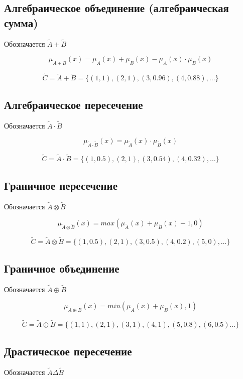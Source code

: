 		\subsection{Алгебраическое объединение (алгебраическая сумма)}
		    Обозначается $\tilde A + \tilde B$
		
	        \[\mu_{\tilde A + \tilde B}(x) = \mu_{\tilde A}(x) + \mu_{\tilde B}(x) - \mu_{\tilde A}(x) \cdot \mu_{\tilde B}(x)\]
		    
			\[\tilde C = \tilde A + \tilde B = \{(1, 1), (2, 1), (3, 0.96), (4, 0.88), \dots\}\]
			
		\subsection{Алгебраическое пересечение}
		    Обозначается $\tilde A \cdot \tilde B$
		
			\[\mu_{\tilde A \cdot \tilde B}(x) = \mu_{\tilde A}(x) \cdot \mu_{\tilde B}(x)\]
			
			\[\tilde C = \tilde A \cdot \tilde B = \{(1, 0.5), (2, 1), (3, 0.54), (4, 0.32), \dots\}\]
			
		\subsection{Граничное пересечение} 
		    Обозначается $\tilde A \otimes \tilde B$
		    
		    \[\mu_{\tilde A \otimes \tilde B}(x) = max(\mu_{\tilde A}(x) + \mu_{\tilde B}(x) - 1, 0)\]
			
			\[\tilde C = \tilde A \otimes \tilde B = \{(1, 0.5), (2, 1), (3, 0.5), (4, 0.2), (5, 0), \dots\}\]
			
		\subsection{Граничное объединение}
		    Обозначается $\tilde A \oplus \tilde B$
		
			\[\mu_{\tilde A \oplus \tilde B}(x) = min(\mu_{\tilde A}(x) + \mu_{\tilde B}(x), 1)\]
			
			\[\tilde C = \tilde A \oplus \tilde B = \{(1, 1), (2, 1), (3, 1), (4, 1), (5, 0.8), (6, 0.5) ...\}\]
			
		\subsection{Драстическое пересечение}
		    Обозначается $\tilde A \Delta \tilde B$
		
